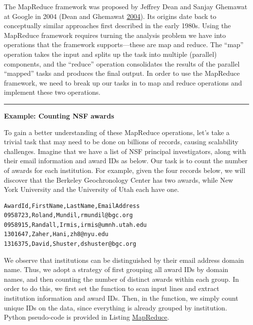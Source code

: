 \documentclass[]{krantz}
\begin{document}
The MapReduce framework was proposed by Jeffrey Dean and Sanjay Ghemawat
at Google in 2004 (Dean and Ghemawat
\protect\hyperlink{ref-MapReduce}{2004}). Its origins date back to
conceptually similar approaches first described in the early 1980s.
Using the MapReduce framework requires turning the analysis problem we
have into operations that the framework supports---these are map and
reduce. The ``map'' operation takes the input and splits up the task
into multiple (parallel) components, and the ``reduce'' operation
consolidates the results of the parallel ``mapped'' tasks and produces
the final output. In order to use the MapReduce framework, we need to
break up our tasks in to map and reduce operations and implement these
two operations.

\begin{center}\rule{0.5\linewidth}{\linethickness}\end{center}

\textbf{Example: Counting NSF awards}

To gain a better understanding of these MapReduce operations, let's take
a trivial task that may need to be done on billions of records, causing
scalability challenges. Imagine that we have a list of NSF principal
investigators, along with their email information and award IDs as
below. Our task is to count the number of awards for each institution.
For example, given the four records below, we will discover that the
Berkeley Geochronology Center has two awards, while New York University
and the University of Utah each have one.

\begin{verbatim}
AwardId,FirstName,LastName,EmailAddress
0958723,Roland,Mundil,rmundil@bgc.org
0958915,Randall,Irmis,irmis@umnh.utah.edu
1301647,Zaher,Hani,zh8@nyu.edu
1316375,David,Shuster,dshuster@bgc.org
\end{verbatim}

We observe that institutions can be distinguished by their email address
domain name. Thus, we adopt a strategy of first grouping all award IDs
by domain names, and then counting the number of distinct awards within
each group. In order to do this, we first set the function to scan input
lines and extract institution information and award IDs. Then, in the
function, we simply count unique IDs on the data, since everything is
already grouped by institution. Python pseudo-code is provided in
Listing \protect\hyperlink{list:parallel1}{MapReduce}.
\end{document}
